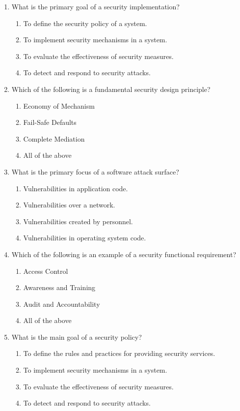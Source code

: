 \documentclass{article}
\begin{document}
\begin{enumerate}
    \item What is the primary goal of a security implementation?
    \begin{enumerate}
        \item To define the security policy of a system.
        \item To implement security mechanisms in a system.
        \item To evaluate the effectiveness of security measures.
        \item To detect and respond to security attacks.
    \end{enumerate}
    
    \item Which of the following is a fundamental security design principle?
    \begin{enumerate}
        \item Economy of Mechanism
        \item Fail-Safe Defaults
        \item Complete Mediation
        \item All of the above
    \end{enumerate}
    
    \item What is the primary focus of a software attack surface?
    \begin{enumerate}
        \item Vulnerabilities in application code.
        \item Vulnerabilities over a network.
        \item Vulnerabilities created by personnel.
        \item Vulnerabilities in operating system code.
    \end{enumerate}
    
    \item Which of the following is an example of a security functional requirement?
    \begin{enumerate}
        \item Access Control
        \item Awareness and Training
        \item Audit and Accountability
        \item All of the above
    \end{enumerate}
      \newpage
    \item What is the main goal of a security policy?
    \begin{enumerate}
        \item To define the rules and practices for providing security services.
        \item To implement security mechanisms in a system.
        \item To evaluate the effectiveness of security measures.
        \item To detect and respond to security attacks.
    \end{enumerate}
    

\end{enumerate}
\end{document}
